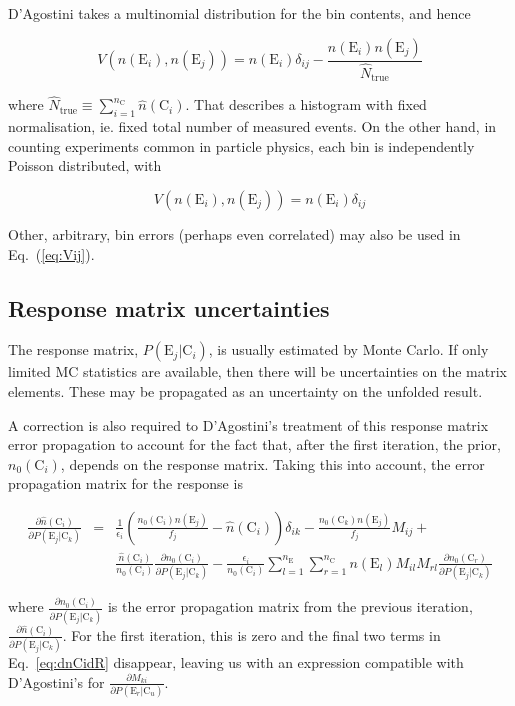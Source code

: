 \documentclass[12pt,a4paper]{article}
\newcommand{\E}{\mathrm{E}}
\newcommand{\C}{\mathrm{C}}
\newcommand{\dd}[2]{\frac{\partial{#1}}{\partial{#2}}}
\begin{document}
D'Agostini takes a multinomial distribution for the bin contents, and hence

\begin{equation}
V(n(\E_i),n(\E_j)) = n(\E_i) \delta_{ij} - \frac{n(\E_i) n(\E_j)}{\hat{N}_{\mathrm{true}}}
\end{equation}

where $\hat{N}_{\mathrm{true}} \equiv \sum_{i=1}^{n_{\C}} \hat{n}(\C_i)$.
That describes a histogram with fixed normalisation, ie. fixed total number of measured events.
On the other hand, in counting experiments common in particle physics, each bin is independently Poisson distributed, with

\begin{equation}
V(n(\E_i),n(\E_j)) = n(\E_i) \delta_{ij}
\end{equation}

Other, arbitrary, bin errors (perhaps even correlated) may also be used in Eq.~(\ref{eq:Vij}).

\subsection{Response matrix uncertainties}

The response matrix, $P(\E_j|\C_i)$, is usually estimated by Monte Carlo. If only limited MC statistics
are available, then there will be uncertainties on the matrix elements.
These may be propagated as an uncertainty on the unfolded result.

A correction is also required to D'Agostini's treatment of this response matrix error propagation
to account for the fact that, after the first iteration, the prior, $n_0(\C_i)$, depends on the response matrix.
Taking this into account, the error propagation matrix for the response is

\begin{eqnarray}
\dd{\hat{n}(\C_i)}{P(\E_j|\C_k)} & = & \frac{1}{\epsilon_i} \left( \frac{n_0(\C_i) n(\E_j)}{f_j} - \hat{n}(\C_i) \right) \delta_{ik}  - \frac{n_0(\C_k) n(\E_j)}{f_j} M_{ij} + \nonumber \\
& & \frac{\hat{n}(\C_i)}{n_0(\C_i)} \dd{n_0(\C_i)}{P(\E_j|\C_k)} - \frac{\epsilon_i}{n_0(\C_i)} \sum_{l=1}^{n_{\E}} \sum_{r=1}^{n_{\C}} n(\E_l) M_{il} M_{rl} \dd{n_0(\C_r)}{P(\E_j|\C_k)}
\label{eq:dnCidR}
\end{eqnarray}

where $\dd{n_0(\C_i)}{P(\E_j|\C_k)}$ is the error propagation matrix from the previous iteration,
$\dd{\hat{n}(\C_i)}{P(\E_j|\C_k)}$. For the first iteration, this is zero and the final two terms in
Eq.~\ref{eq:dnCidR} disappear, leaving us with an expression compatible with D'Agostini's for $\dd{M_{ki}}{P(\E_r|\C_u)}$.
\end{document}
